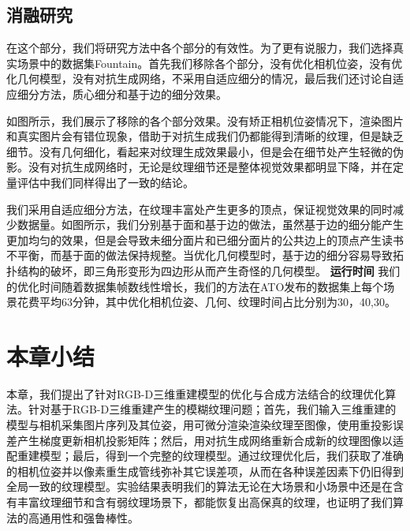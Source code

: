 \subsection{消融研究}
在这个部分，我们将研究方法中各个部分的有效性。为了更有说服力，我们选择真实场景中的数据集Fountain。首先我们移除各个部分，没有优化相机位姿，没有优化几何模型，没有对抗生成网络，不采用自适应细分的情况，最后我们还讨论自适应细分方法，质心细分和基于边的细分效果。\par
如图所示，我们展示了移除的各个部分效果。没有矫正相机位姿情况下，渲染图片和真实图片会有错位现象，借助于对抗生成我们仍都能得到清晰的纹理，但是缺乏细节。没有几何细化，看起来对纹理生成效果最小，但是会在细节处产生轻微的伪影。没有对抗生成网络时，无论是纹理细节还是整体视觉效果都明显下降，并在定量评估中我们同样得出了一致的结论。\par
我们采用自适应细分方法，在纹理丰富处产生更多的顶点，保证视觉效果的同时减少数据量。如图所示，我们分别基于面和基于边的做法，虽然基于边的细分能产生更加均匀的效果，但是会导致未细分面片和已细分面片的公共边上的顶点产生读书不平衡，而基于面的做法保持规整。当优化几何模型时，基于边的细分容易导致拓扑结构的破坏，即三角形变形为四边形从而产生奇怪的几何模型。
\noindent \textbf{运行时间}
我们的优化时间随着数据集帧数线性增长，我们的方法在ATO发布的数据集上每个场景花费平均63分钟，其中优化相机位姿、几何、纹理时间占比分别为30，40,30。
\section{本章小结}

本章，我们提出了针对RGB-D三维重建模型的优化与合成方法结合的纹理优化算法。针对基于RGB-D三维重建产生的模糊纹理问题；首先，我们输入三维重建的模型与相机采集图片序列及其位姿，用可微分渲染渲染纹理至图像，使用重投影误差产生梯度更新相机投影矩阵；然后，用对抗生成网络重新合成新的纹理图像以适配重建模型；最后，得到一个完整的纹理模型。通过纹理优化后，我们获取了准确的相机位姿并以像素重生成管线弥补其它误差项，从而在各种误差因素下仍旧得到全局一致的纹理模型。实验结果表明我们的算法无论在大场景和小场景中还是在含有丰富纹理细节和含有弱纹理场景下，都能恢复出高保真的纹理，也证明了我们算法的高通用性和强鲁棒性。



